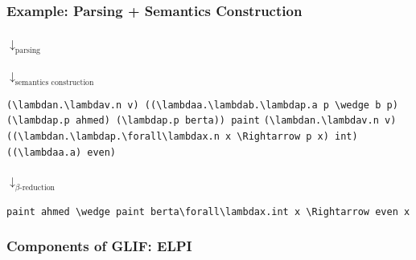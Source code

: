 \begin{frame}[fragile]
    \frametitle{Example: Parsing + Semantics Construction}
    {\centering{}\par}\vspace{1em}
    \hspace{0.49\textwidth}$\downarrow_{\text{parsing}}$\par\vspace{1em}
    {\centering\color{logicfont!50!nlfont} \par}\vspace{1em}
    \hspace{0.49\textwidth}$\downarrow_{\text{semantics construction}}$\par\vspace{1em}
    {\centering\begin{adjustbox}{}\color{logicfont}\footnotesize\ifx\switchtomathexample\undefined
        \lstinline[language=MMT]|(\lambdan.\lambdav.n v) ((\lambdaa.\lambdab.\lambdap.a p \wedge b p) (\lambdap.p ahmed) (\lambdap.p berta)) paint|\else
                    \lstinline[language=MMT]|(\lambdan.\lambdav.n v) ((\lambdan.\lambdap.\forall\lambdax.n x \Rightarrow p x) int) ((\lambdaa.a) even)|
                \fi
    \end{adjustbox}\par}\vspace{1em}
    \hspace{0.49\textwidth}$\downarrow_{\text{$\beta$-reduction}}$\par\vspace{1em}
{\centering\color{logicfont}\small\begin{adjustbox}{}\ifx\switchtomathexample\undefined\lstinline[language=MMT]|paint ahmed \wedge paint berta|\else\lstinline[language=MMT]|\forall\lambdax.int x \Rightarrow even x|\fi\end{adjustbox}\par}
\end{frame}

\begin{frame}
    \frametitle{Components of GLIF: ELPI}
    
\end{frame}

